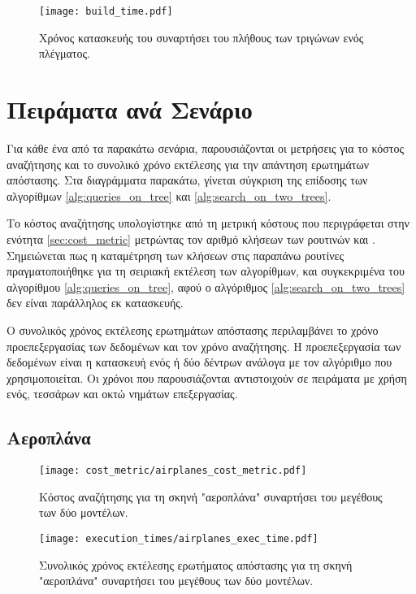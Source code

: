\begin{figure}[h]
    \centering
    \texttt{[image: build\_time.pdf]}
    \caption[Χρόνοι Κατασκευής του ]{
        Χρόνος κατασκευής του  συναρτήσει 
        του πλήθους των τριγώνων ενός πλέγματος.
    }
    \label{fig:build_time}
\end{figure}

\section{Πειράματα ανά Σενάριο}
Για κάθε ένα από τα παρακάτω σενάρια, παρουσιάζονται οι 
μετρήσεις για το κόστος αναζήτησης και το συνολικό χρόνο 
εκτέλεσης για την απάντηση ερωτημάτων απόστασης.
Στα διαγράμματα παρακάτω, γίνεται σύγκριση της επίδοσης των αλγορίθμων 
\ref{alg:queries_on_tree} και \ref{alg:search_on_two_trees}.

Το κόστος αναζήτησης υπολογίστηκε από τη μετρική κόστους 
που περιγράφεται στην ενότητα \ref{sec:cost_metric} 
μετρώντας τον αριθμό κλήσεων των ρουτινών 
 και .
Σημειώνεται πως η καταμέτρηση των κλήσεων στις παραπάνω ρουτίνες 
πραγματοποιήθηκε για τη σειριακή εκτέλεση των αλγορίθμων, και συγκεκριμένα 
του αλγορίθμου \ref{alg:queries_on_tree}, αφού ο αλγόριθμος 
\ref{alg:search_on_two_trees} δεν είναι παράλληλος εκ κατασκευής.

Ο συνολικός χρόνος εκτέλεσης ερωτημάτων απόστασης περιλαμβάνει 
το χρόνο προεπεξεργασίας των δεδομένων και τον χρόνο αναζήτησης.
Η προεπεξεργασία των δεδομένων είναι η κατασκευή ενός ή δύο δέντρων 
ανάλογα με τον αλγόριθμο που χρησιμοποιείται.
Οι χρόνοι που παρουσιάζονται αντιστοιχούν σε πειράματα με χρήση 
ενός, τεσσάρων και οκτώ νημάτων επεξεργασίας.

\subsection{Αεροπλάνα}

\begin{figure}[H]
    \centering
    \texttt{[image: cost\_metric/airplanes\_cost\_metric.pdf]}
    \caption[Κόστος Αναζήτησης για "αεροπλάνα"] {
        Κόστος αναζήτησης για τη σκηνή "αεροπλάνα" συναρτήσει 
        του μεγέθους των δύο μοντέλων.
    }
\end{figure}

\begin{figure}[H]
    \centering
    \texttt{[image: execution\_times/airplanes\_exec\_time.pdf]}
    \caption[Συνολικός Χρόνος Εκτέλεσης για "αεροπλάνα"] {
        Συνολικός χρόνος εκτέλεσης ερωτήματος απόστασης 
        για τη σκηνή "αεροπλάνα" συναρτήσει του μεγέθους των δύο μοντέλων.
    }
\end{figure}

